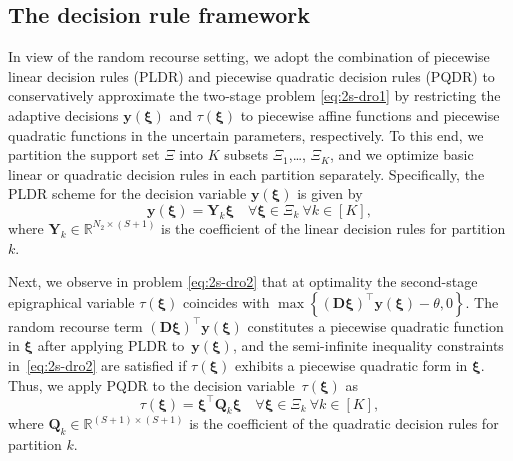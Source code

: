 \documentclass{article}
\begin{document}
\subsection{The decision rule framework}
\label{sec:PLDR}
In view of the random recourse setting, we adopt the combination of  piecewise linear decision rules (PLDR) and piecewise quadratic decision rules (PQDR) to conservatively approximate the two-stage problem \eqref{eq:2s-dro1} by restricting the adaptive decisions  $\bm y (\bm \xi)$ and $\tau(\bm \xi)$ to piecewise affine functions and piecewise quadratic functions in the uncertain parameters, respectively. 
To this end, we partition the support set $\Xi$ into $K$ subsets $\Xi_1$,\ldots, $\Xi_K$, and we optimize basic linear or quadratic decision rules in each partition separately. Specifically, the PLDR scheme for the decision variable $\bm y (\bm \xi)$ is given by
\begin{equation*}
\bm y(\bm \xi) = \bm Y_k\bm \xi \quad \forall \bm \xi \in \Xi_k \ \forall k \in [K],
\end{equation*}
 where $\bm Y_k \in \mathbb{R}^{N_2 \times (S+1)}$ is the coefficient of the linear decision rules for partition $k$. 
 
 Next,  we observe in problem \eqref{eq:2s-dro2} that at optimality the second-stage epigraphical variable $\tau(\bm \xi)$ coincides with $\max \left \{ (\bm D \bm \xi)^\top \bm y (\bm \xi) - \theta, 0 \right \}$. The random recourse term $(\bm D \bm \xi)^\top \bm y (\bm \xi)$ constitutes a piecewise quadratic function in $\bm \xi$ after applying PLDR to~$\bm y(\bm \xi)$, and the semi-infinite inequality constraints in~\eqref{eq:2s-dro2} are satisfied if $\tau(\bm \xi)$ exhibits a piecewise quadratic form in $\bm \xi$. Thus, we apply PQDR to the decision variable~$\tau(\bm \xi)$ as 
 \begin{equation*}
 \tau(\bm \xi) = \bm \xi^\top \bm Q_k \bm\xi \quad \forall \bm \xi \in \Xi_k \ \forall k \in [K],
\end{equation*}
where $ \bm Q_k \in \mathbb{R}^{(S+1) \times (S+1)}$ is the coefficient of the quadratic decision rules for partition $k$. 
\end{document}
